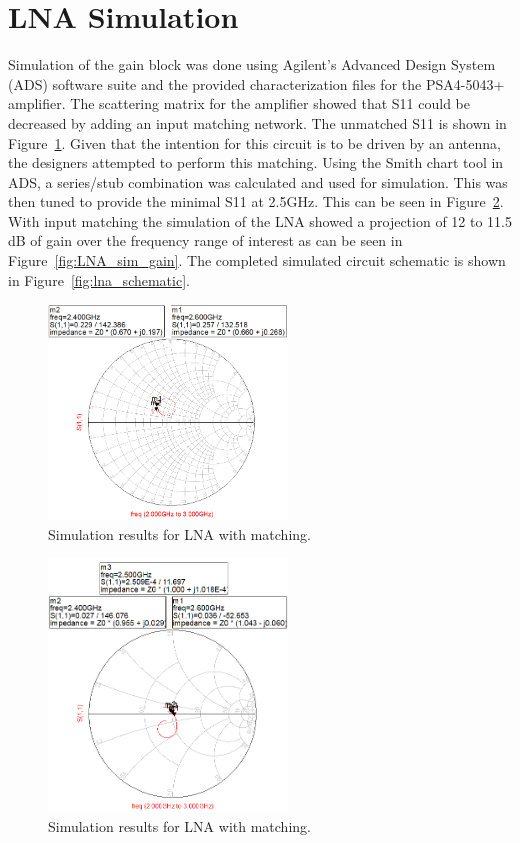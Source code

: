 \documentclass[conference]{IEEEtran}
\begin{document}
\section{LNA Simulation}
Simulation of the gain block was done using Agilent's Advanced Design System (ADS) software suite and the provided characterization files for the PSA4-5043+ amplifier. The scattering matrix for the amplifier showed that S11 could be decreased by adding an input matching network. The unmatched S11 is shown in Figure~\ref{fig:LNA_Smith_unmatched}. Given that the intention for this circuit is to be driven by an antenna, the designers attempted to perform this matching. Using the Smith chart tool in ADS, a series/stub combination was calculated and used for simulation. This was then tuned to provide the minimal S11 at 2.5GHz. This can be seen in Figure~\ref{fig:LNA_Smith_matched}. With input matching the simulation of the LNA showed a projection of 12 to 11.5 dB of gain over the frequency range of interest as can be seen in Figure~\ref{fig:LNA_sim_gain}. The completed simulated circuit schematic is shown in Figure~\ref{fig:lna_schematic}.

\begin{figure}[!h]
\centering
\includegraphics[width=2.5in]{amplifier_simulation_pics/MMIC_unmatched_circuit-with-transmission-lines.PNG}
\caption{Simulation results for LNA with matching.}
\label{fig:LNA_Smith_unmatched}
\end{figure}

\begin{figure}[!h]
\centering
\includegraphics[width=2.5in]{amplifier_simulation_pics/MMIC_matched_circuit-with-transmission-lines.PNG}
\caption{Simulation results for LNA with matching.}
\label{fig:LNA_Smith_matched}
\end{figure}
\end{document}
